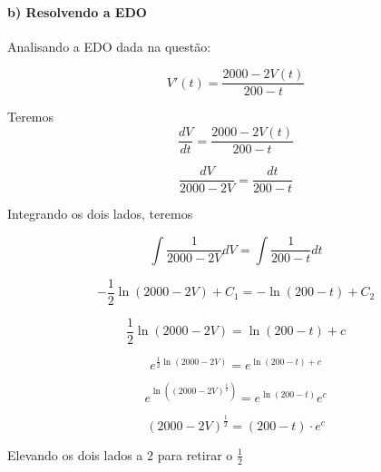 \documentclass[11pt]{article}
\begin{document}
\hypertarget{b-resolvendo-a-edo}{%
\paragraph{b) Resolvendo a EDO}\label{b-resolvendo-a-edo}}

Analisando a EDO dada na questão:

\begin{equation}
    \label{edo_3}
    V'(t) = \frac{2000 - 2V(t)}{200 - t}
\end{equation}

Teremos \begin{equation*}
    \label{edo_3_1}
    \frac{dV}{dt} = \frac{2000 - 2V(t)}{200 - t}
\end{equation*}

\begin{equation*}
    \label{edo_3_2}
    \frac{dV}{2000 - 2V} = \frac{dt}{200 - t}
\end{equation*}

Integrando os dois lados, teremos

\begin{equation*}
    \label{edo_3_3}
    \int\frac{1}{2000 - 2V}dV = \int\frac{1}{200 - t}dt
\end{equation*}

\begin{equation*}
    \label{edo_3_4}
    -\frac{1}{2}\ln(2000 - 2V) + C_{1} = -\ln(200 - t) + C_{2}
\end{equation*}

\begin{equation*}
    \label{edo_3_5}
    \frac{1}{2}\ln(2000 - 2V) = \ln(200 - t) + c
\end{equation*}

\begin{equation*}
    \label{edo_3_6}
    e^{\frac{1}{2}\ln(2000 - 2V)} = e^{\ln(200 - t) + c}
\end{equation*}

\begin{equation*}
    \label{edo_3_7}
    e^{\ln((2000 - 2V)^{\frac{1}{2}})} = e^{\ln(200 - t)}e^{c}
\end{equation*}

\begin{equation*}
    \label{edo_3_8}
    (2000 - 2V)^{\frac{1}{2}} = (200 - t) \cdot e^{c}
\end{equation*}

Elevando os dois lados a \(2\) para retirar o \(\frac{1}{2}\)
\end{document}
